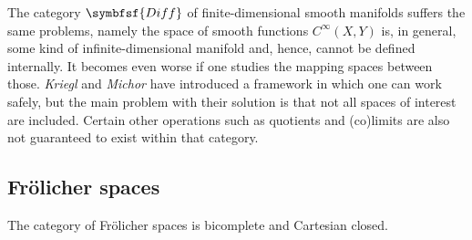     The category $\symbfsf{Diff}$ of finite-dimensional smooth manifolds suffers the same problems, namely the space of smooth functions $C^\infty(X,Y)$ is, in general, some kind of infinite-dimensional manifold and, hence, cannot be defined internally. It becomes even worse if one studies the mapping spaces between those. \textit{Kriegl} and \textit{Michor} have introduced a framework in which one can work safely, but the main problem with their solution is that not all spaces of interest are included. Certain other operations such as quotients and (co)limits are also not guaranteed to exist within that category.

\subsection{Fr\"olicher spaces}


    \begin{property}
        The category of Fr\"olicher spaces is bicomplete and Cartesian closed.
    \end{property}

